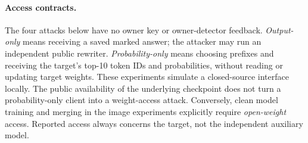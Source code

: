 \paragraph{Access contracts.} The four attacks below have no owner key or owner-detector feedback. \emph{Output-only} means receiving a saved marked answer; the attacker may run an independent public rewriter. \emph{Probability-only} means choosing prefixes and receiving the target's top-10 token IDs and probabilities, without reading or updating target weights. These experiments simulate a closed-source interface locally. The public availability of the underlying checkpoint does not turn a probability-only client into a weight-access attack. Conversely, clean model training and merging in the image experiments explicitly require \emph{open-weight} access. Reported access always concerns the target, not the independent auxiliary model.

